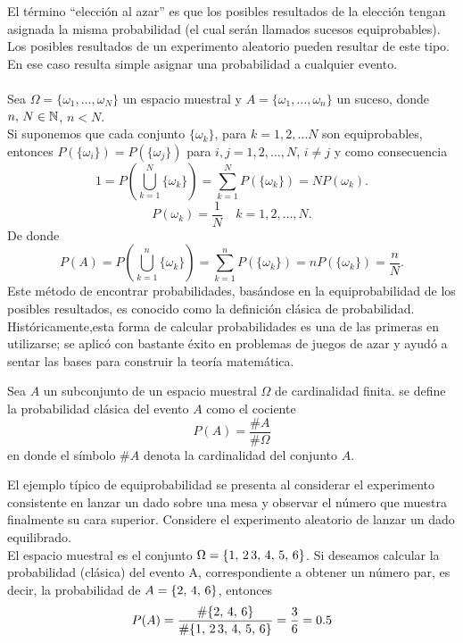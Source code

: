 El término “elección al azar” es que los posibles resultados de la elección tengan asignada la misma probabilidad (el cual serán llamados sucesos equiprobables).\\Los posibles resultados de un experimento aleatorio pueden resultar de este tipo. En ese caso resulta simple asignar una probabilidad a cualquier evento.\\\\
Sea $\Omega=\{\omega_1,\ldots,\omega_N\}$ un espacio muestral y $A=\{\omega_1,\ldots,\omega_n\}$ un suceso, donde $n,\thinspace N\in{\mathbb{N}}$, $ n<N$.\\
Si suponemos que cada conjunto  $\{\omega_k\}$, para $k=1,2,\ldots N$ son equiprobables, entonces $P(\{\omega_i\})=P(\{\omega_j\})$ para $i,j=1,2,\ldots,N$, $i\not=j$ y como consecuencia $$1=P(\bigcup_{k=1}^N \{\omega_k\})=\sum_{k=1}^N P(\{\omega_k\})=NP(\omega_k).$$
$$P(\omega_k)=\frac{1}{N}\quad k=1,2,\ldots ,N.$$
De donde $$P(A)=P(\bigcup_{k=1}^n \{\omega_k\})=\sum_{k=1}^n P(\{\omega_k\})=n P(\{\omega_k\})=\frac{n}{N}.$$
Este método de encontrar probabilidades, basándose en la equiprobabilidad de los posibles resultados, es conocido como la definición clásica de probabilidad.\\Históricamente,esta forma de calcular probabilidades es una de las primeras en utilizarse; se aplicó con bastante éxito en problemas de juegos de azar y ayudó a sentar las bases para construir la teoría matemática.
\begin{Def}
    Sea $A$ un subconjunto de un espacio muestral $\Omega$ de cardinalidad finita. se define la probabilidad clásica del evento $A$ como el cociente $$P(A)=\frac{\#A}{\#\Omega}$$ en donde el símbolo $\#A$ denota la cardinalidad del conjunto $A$.
    \label{def-prob-probClásica}
\end{Def}
\begin{Ejm}
    El ejemplo típico de equiprobabilidad se presenta al considerar el experimento consistente en lanzar un dado sobre una mesa y observar el número que muestra finalmente su cara superior. Considere el experimento aleatorio de lanzar un dado equilibrado.\\ El espacio muestral es el conjunto  $\Omega=\{1,\thinspace 2\thinspace 3,\thinspace 4,\thinspace 5,\thinspace 6\}$. Si deseamos
    calcular la probabilidad (clásica) del evento A, correspondiente a obtener
    un número par, es decir, la probabilidad de $A=\{2,\thinspace 4,\thinspace 6\}$, entonces $$P(A)=\frac{\#\{2,\thinspace 4,\thinspace 6\}}{\#\{1,\thinspace 2\thinspace 3,\thinspace 4,\thinspace 5,\thinspace 6\}}=\frac{3}{6}=0.5$$
\end{Ejm}
